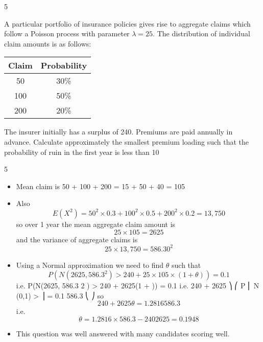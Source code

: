 \documentclass[a4paper,12pt]{article}
\begin{document}
5

A particular portfolio of insurance policies gives rise to aggregate claims which
follow a Poisson process with parameter $\lambda = 25$. The distribution of individual claim
amounts is as follows:
\begin{center}
\begin{tabular}{cc}
Claim & Probability\\ \hline 
50& 30\% \\  \hline 
100 & 50\% \\  \hline 
200 & 20\% \\  \hline 
\end{tabular}
\end{center}
The insurer initially has a surplus of 240. Premiums are paid annually in advance.
Calculate approximately the smallest premium loading such that the probability of
ruin in the first year is less than 10%



5
\begin{itemize}
\item Mean claim is 50  + 100  + 200 
= 15 + 50 + 40
= 105

\item Also
\[E(X^2 ) = 50^2 \times  0.3 + 100^2 \times  0.5 + 200^2 \times  0.2
= 13,750\]
so over 1 year the mean aggregate claim amount is
\[25 \times  105 = 2625\]
and the variance of aggregate claims is
\[25 \times  13,750 = 586.30^2\]

\item Using a Normal approximation we need to find $\theta$ such that
\[P(N(2625, 586.3^2 ) > 240 + 25 \times 105 \times  (1 + \theta)) = 0.1\]
i.e.
P(N(2625, 586.3 2 ) > 240 + 2625(1 + \theta)) = 0.1
i.e. 240 + 2625 \theta ⎞
⎛
P ⎜ N (0,1) >
⎟ = 0.1
586.3
⎝
⎠
so \[240 + 2625 \theta
= 1.2816
586.3\]
i.e. \[\theta =
1.2816 \times  586.3 − 240
2625
= 0.1948\]
\item This question was well answered with many candidates scoring well.
\end{itemize}
\end{document}

